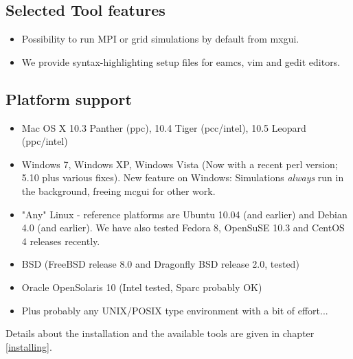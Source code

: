 \subsection{Selected Tool features}
\begin{itemize}
  \item Possibility to run MPI or grid simulations by default from mxgui.
  \item We provide syntax-highlighting setup files for eamcs, vim and gedit editors.
\end{itemize}
\subsection{Platform support}
\begin{itemize}
\item Mac OS X 10.3 Panther (ppc), 10.4 Tiger (pcc/intel), 10.5 Leopard (ppc/intel)
\item Windows 7, Windows XP,  Windows Vista (Now with a recent perl version; 5.10 plus various fixes). New feature on Windows:
     Simulations \emph{always} run in the background, freeing mcgui for other work.
\item "Any" Linux - reference platforms are Ubuntu 10.04 (and earlier) and Debian 4.0 (and earlier). We have also tested 
  Fedora 8, OpenSuSE 10.3 and CentOS 4 releases recently.
\item BSD (FreeBSD release 8.0 and Dragonfly BSD release 2.0, tested)
\item Oracle OpenSolaris 10 (Intel tested, Sparc probably OK)
\item Plus probably any UNIX/POSIX type environment with a bit of effort...
\end{itemize}
Details about the installation and the available tools are given in chapter \ref{installing}.

